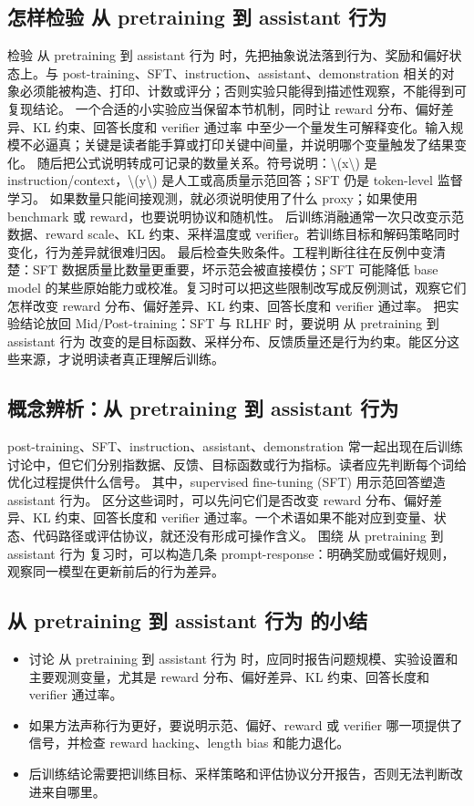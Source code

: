 \documentclass[a4paper]{article}
\begin{document}
\subsection{怎样检验 从 pretraining 到 assistant 行为}
检验 从 pretraining 到 assistant 行为 时，先把抽象说法落到行为、奖励和偏好状态上。与 post-training、SFT、instruction、assistant、demonstration 相关的对象必须能被构造、打印、计数或评分；否则实验只能得到描述性观察，不能得到可复现结论。
一个合适的小实验应当保留本节机制，同时让 reward 分布、偏好差异、KL 约束、回答长度和 verifier 通过率 中至少一个量发生可解释变化。输入规模不必逼真；关键是读者能手算或打印关键中间量，并说明哪个变量触发了结果变化。
随后把公式说明转成可记录的数量关系。符号说明：\textbackslash{}(x\textbackslash{}) 是 instruction/context，\textbackslash{}(y\textbackslash{}) 是人工或高质量示范回答；SFT 仍是 token-level 监督学习。 如果数量只能间接观测，就必须说明使用了什么 proxy；如果使用 benchmark 或 reward，也要说明协议和随机性。
后训练消融通常一次只改变示范数据、reward scale、KL 约束、采样温度或 verifier。若训练目标和解码策略同时变化，行为差异就很难归因。
最后检查失败条件。工程判断往往在反例中变清楚：SFT 数据质量比数量更重要，坏示范会被直接模仿；SFT 可能降低 base model 的某些原始能力或校准。复习时可以把这些限制改写成反例测试，观察它们怎样改变 reward 分布、偏好差异、KL 约束、回答长度和 verifier 通过率。
把实验结论放回 Mid/Post-training：SFT 与 RLHF 时，要说明 从 pretraining 到 assistant 行为 改变的是目标函数、采样分布、反馈质量还是行为约束。能区分这些来源，才说明读者真正理解后训练。
\subsection{概念辨析：从 pretraining 到 assistant 行为}
post-training、SFT、instruction、assistant、demonstration 常一起出现在后训练讨论中，但它们分别指数据、反馈、目标函数或行为指标。读者应先判断每个词给优化过程提供什么信号。
其中，supervised fine-tuning (SFT) 用示范回答塑造 assistant 行为。
区分这些词时，可以先问它们是否改变 reward 分布、偏好差异、KL 约束、回答长度和 verifier 通过率。一个术语如果不能对应到变量、状态、代码路径或评估协议，就还没有形成可操作含义。
围绕 从 pretraining 到 assistant 行为 复习时，可以构造几条 prompt-response：明确奖励或偏好规则，观察同一模型在更新前后的行为差异。
\subsection{从 pretraining 到 assistant 行为 的小结}
\begin{itemize}
\item 讨论 从 pretraining 到 assistant 行为 时，应同时报告问题规模、实验设置和主要观测变量，尤其是 reward 分布、偏好差异、KL 约束、回答长度和 verifier 通过率。
\item 如果方法声称行为更好，要说明示范、偏好、reward 或 verifier 哪一项提供了信号，并检查 reward hacking、length bias 和能力退化。
\item 后训练结论需要把训练目标、采样策略和评估协议分开报告，否则无法判断改进来自哪里。
\end{itemize}
\end{document}
